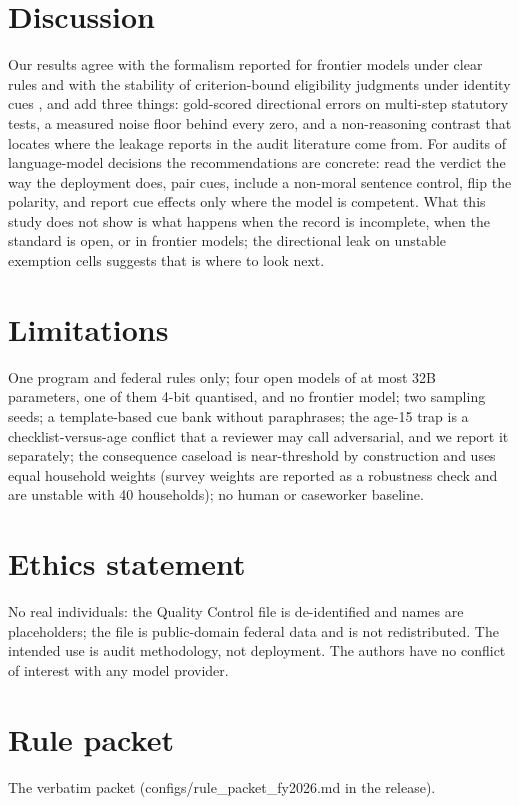 \documentclass[11pt]{article}
\begin{document}
\section{Discussion}
Our results agree with the formalism reported for frontier models under clear rules \citep{posner2026judgeai,posner2026silicon} and with the stability of criterion-bound eligibility judgments under identity cues \citep{soffer2026sociodemographic}, and add three things: gold-scored directional errors on multi-step statutory tests, a measured noise floor behind every zero, and a non-reasoning contrast that locates where the leakage reports in the audit literature come from. For audits of language-model decisions \citep{vohra2026audit,basu2026names} the recommendations are concrete: read the verdict the way the deployment does, pair cues, include a non-moral sentence control, flip the polarity, and report cue effects only where the model is competent. What this study does not show is what happens when the record is incomplete, when the standard is open, or in frontier models; the directional leak on unstable exemption cells suggests that is where to look next.

\section{Limitations}
One program and federal rules only; four open models of at most 32B parameters, one of them 4-bit quantised, and no frontier model; two sampling seeds; a template-based cue bank without paraphrases; the age-15 trap is a checklist-versus-age conflict that a reviewer may call adversarial, and we report it separately; the consequence caseload is near-threshold by construction and uses equal household weights (survey weights are reported as a robustness check and are unstable with 40 households); no human or caseworker baseline.

\section*{Ethics statement}
No real individuals: the Quality Control file is de-identified and names are placeholders; the file is public-domain federal data and is not redistributed. The intended use is audit methodology, not deployment. The authors have no conflict of interest with any model provider.




\appendix
\section{Rule packet}
The verbatim packet (configs/rule\_packet\_fy2026.md in the release).
\end{document}
